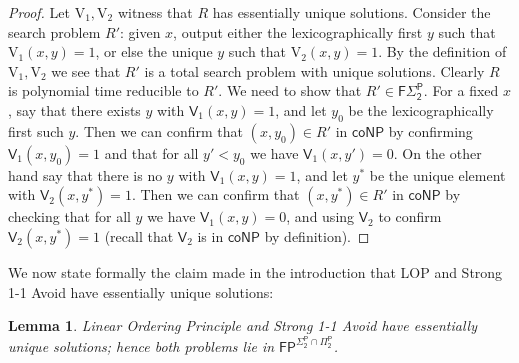 \documentclass[11pt]{article}
\newtheorem{lemma}{Lemma}
\begin{document}
\begin{proof}
Let $\mathrm{V}_1,\mathrm{V}_2$ witness that $R$ has essentially unique solutions. Consider the search problem $R'$: given $x$, output either the lexicographically first $y$ such that $\mathrm{V}_1(x,y)=1$, or else the unique $y$ such that $\mathrm{V}_2(x,y)=1$. By the definition of $\mathrm{V}_1,\mathrm{V}_2$ we see that $R'$ is a total search problem with unique solutions. Clearly $R$ is polynomial time reducible to $R'$. We need to show that $R' \in \mathsf{F\Sigma_2^P}$. For a fixed $x$, say that there exists $y$ with $\mathsf{V}_1(x,y)=1$, and let $y_0$ be the lexicographically first such $y$. Then we can confirm that $(x,y_0) \in R'$ in $\mathsf{coNP}$ by confirming $\mathsf{V}_1(x,y_0)=1$ and that for all $y'<y_0$ we have $\mathsf{V}_1(x,y')=0$. On the other hand say that there is no $y$ with $\mathsf{V}_1(x,y)=1$, and let $y^*$ be the unique element with $\mathsf{V}_2(x,y^*)=1$. Then we can confirm that $(x,y^*) \in R'$ in $\mathsf{coNP}$ by checking that for all $y$ we have $\mathsf{V}_1(x,y)=0$, and using $\mathsf{V}_2$ to confirm $\mathsf{V}_2(x,y^*)=1$ (recall that $\mathsf{V}_2$ is in $\mathsf{coNP}$ by definition).
\end{proof}
We now state formally the claim made in the introduction that LOP and Strong 1-1 Avoid have essentially unique solutions:
\begin{lemma}\label{lem:1-1-lop-unique}
Linear Ordering Principle and Strong 1-1 Avoid have essentially unique solutions; hence both problems lie in $\mathsf{FP^{\Sigma_2^P \cap \Pi_2^P}}$.
\end{lemma}
\end{document}
